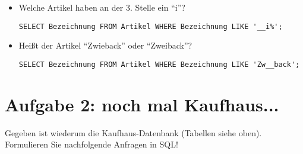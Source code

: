 \documentclass{lehramt-informatik}
\begin{document}
\begin{enumerate}
\begin{itemize}

\item Welche Artikel haben an der 3. Stelle ein “i”?

\begin{antwort}[muster]
\begin{verbatim}
SELECT Bezeichnung FROM Artikel WHERE Bezeichnung LIKE '__i%';
\end{verbatim}
\end{antwort}


\item Heißt der Artikel “Zwieback” oder “Zweiback”?

\begin{antwort}[muster]
\begin{verbatim}
SELECT Bezeichnung FROM Artikel WHERE Bezeichnung LIKE 'Zw__back';
\end{verbatim}
\end{antwort}
\end{itemize}

\end{enumerate}

%

\section{Aufgabe 2: noch mal Kaufhaus...}

Gegeben ist wiederum die Kaufhaus-Datenbank (Tabellen siehe oben).
Formulieren Sie nachfolgende Anfragen in SQL!
\end{document}
